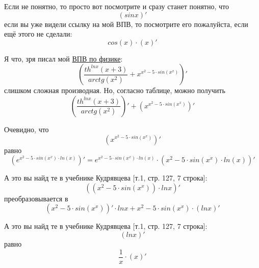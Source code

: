 \documentclass[a4paper, 12pt]{article}
\begin{document}
Если не понятно, то просто вот посмотрите и сразу станет понятно, что
\begin{equation}
\left(sinx \right)'
\end{equation}
если вы уже видели ссылку на мой ВПВ, то посмотрите его пожалуйста, если ещё этого не сделали:
\begin{equation}
cos \left( x \right) \cdot \left( x \right)'
\end{equation}

Я что, зря писал мой \href{https://drive.google.com/drive/folders/1cQOob8lLqhboZnilkguOm7CtLHlbPb1G?usp=sharing}{ВПВ по физике}:
\begin{equation}
\left(\frac{th^{lnx}\left(x + 3\right)}{arctg\left(x^{2}\right)} + x^{x^{2} - 5 \cdot sin\left(x^{x}\right)} \right)'
\end{equation}
слишком сложная производная. Но, согласно таблице, можно получить
\begin{equation}
\left( \frac{th^{lnx}\left(x + 3\right)}{arctg\left(x^{2}\right)} \right) ' + \left( x^{x^{2} - 5 \cdot sin\left(x^{x}\right)} \right)'
\end{equation}

Очевидно, что
\begin{equation}
\left(x^{x^{2} - 5 \cdot sin\left(x^{x}\right)} \right)'
\end{equation}
равно
\begin{equation}
\left(e^{x^{2} - 5 \cdot sin\left(x^{x}\right)\cdot ln \left(x \right)}  \right)' = e^{x^{2} - 5 \cdot sin\left(x^{x}\right)\cdot ln \left(x \right)} \cdot \left( x^{2} - 5 \cdot sin\left(x^{x}\right)\cdot ln \left(x \right) \right)'
\end{equation}

А это вы найд те в учебнике Кудрявцева [т.1, стр. 127, 7 строка]:
\begin{equation}
\left(\left(x^{2} - 5 \cdot sin\left(x^{x}\right)\right) \cdot lnx \right)'
\end{equation}
преобразовывается в
\begin{equation}
\left(x^{2} - 5 \cdot sin\left(x^{x}\right) \right)' \cdot lnx + x^{2} - 5 \cdot sin\left(x^{x}\right)\cdot \left( lnx \right)'
\end{equation}

А это вы найд те в учебнике Кудрявцева [т.1, стр. 127, 7 строка]:
\begin{equation}
\left(lnx \right)'
\end{equation}
равно
\begin{equation}
\frac{1}{x} \cdot \left(x \right)'
\end{equation}
\end{document}
